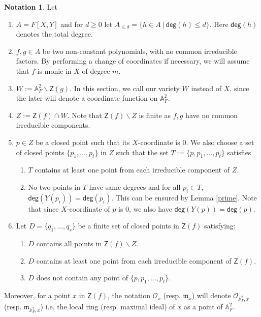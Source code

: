 \documentclass[10pt]{amsart}
\theoremstyle{plain}
\theoremstyle{definition}
\newtheorem{notation}[thm]{Notation}
\newcommand{\intersection}{\cap}
\newcommand{\sO}{{\mathcal O}}
\newcommand{\A}{{\mathbb A}}
\let\syn\mathsf
\newcommand{\scr}{\scriptscriptstyle}
\newcommand{\dg}{\syn{deg}}
\begin{document}
\begin{notation}\label{notationa2} Let 
\begin{enumerate}
\item $A =F[X,Y]$ and for $d\geq 0$ let $A_{\scr \leq d} = \{h\in A\ |\ \dg(h)\leq d \}$. Here $\dg(h)$ denotes the total degree. 
\item $f,g\in A$ be two non-constant polynomials, with no common irreducible factors. By performing a change of coordinates if necessary, we will assume that  $f$ is monic in $X$ of degree $m$. 
\item $W:=  \A^2_F \backslash \syn{Z}(g)$. In this section, we call our variety $W$ instead of $X$, since the later will denote a coordinate function on $\A^2_F$. 
\item $Z:= \syn{Z}(f)\intersection W$. Note that $\syn{Z}(f)\backslash Z$ is finite as $f,g$ have no common irreducible components. 
\item $p\in Z$ be a closed point such that its $X$-coordinate is $0$. We also choose a set of closed points $\{p_1,...,p_t\}$ in $Z$ such that the set $T:= \{p,p_1,...,p_t\}$ satisfies 
	\begin{enumerate}
		\item $T$ contains at least one point from each irreducible component of $Z$.
		\item  No two points in $T$ have same degrees and for all $p_i\in T$,  $\dg(Y(p_i))= \dg(p_i)$. This can be ensured by Lemma \ref{prime}. Note that since $X$-coordinate of $p$ is $0$, we also have $\dg(Y(p))=\dg(p)$. 
	\end{enumerate}
\item Let $D=   \{q_1,\ldots, q_s\}$ be a finite set of closed points in $\syn{Z}(f)$ satisfying:
	\begin{enumerate} 
		\item  $D$ contains all points in $\syn{Z}(f)\backslash Z$. 
		\item $D$ contains at least one point from each irreducible component of $\syn{Z}(f)$. 
		\item $D$ does not contain any point of $\{p,p_1,...,p_t\}$.
	\end{enumerate}
\end{enumerate}
Moreover, for a point $x$ in $\syn{Z}(f)$, the notation $\sO_x$ (resp. ${\mathfrak m}_x$) will denote $\sO_{\A^2_F,x}$ (resp. ${\mathfrak m}_{\A^2_F,x}$) i.e.  the local ring (resp. maximal ideal) of $x$ as a point of $\A^2_F$. 
\end{notation}
\end{document}
